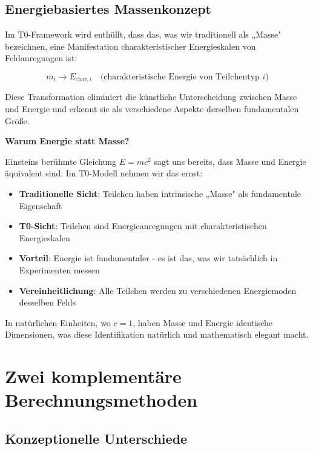 \documentclass[12pt,a4paper]{article}
\begin{document}
	\subsection{Energiebasiertes Massenkonzept}
	\label{subsec:energy_based_mass}
	
	Im T0-Framework wird enthüllt, dass das, was wir traditionell als „Masse" bezeichnen, eine Manifestation charakteristischer Energieskalen von Feldanregungen ist:
	
	\begin{equation}
		\boxed{m_i \rightarrow E_{\text{char},i} \quad \text{(charakteristische Energie von Teilchentyp } i\text{)}}
		\label{eq:mass_to_energy}
	\end{equation}
	
	Diese Transformation eliminiert die künstliche Unterscheidung zwischen Masse und Energie und erkennt sie als verschiedene Aspekte derselben fundamentalen Größe.
	
	\textbf{Warum Energie statt Masse?}
	
	Einsteins berühmte Gleichung $E = mc^2$ sagt uns bereits, dass Masse und Energie äquivalent sind. Im T0-Modell nehmen wir das ernst:
	
	\begin{itemize}
		\item \textbf{Traditionelle Sicht}: Teilchen haben intrinsische „Masse" als fundamentale Eigenschaft
		\item \textbf{T0-Sicht}: Teilchen sind Energieanregungen mit charakteristischen Energieskalen
		\item \textbf{Vorteil}: Energie ist fundamentaler - es ist das, was wir tatsächlich in Experimenten messen
		\item \textbf{Vereinheitlichung}: Alle Teilchen werden zu verschiedenen Energiemoden desselben Felds
	\end{itemize}
	
	In natürlichen Einheiten, wo $c = 1$, haben Masse und Energie identische Dimensionen, was diese Identifikation natürlich und mathematisch elegant macht.
	
	\section{Zwei komplementäre Berechnungsmethoden}
	\label{sec:two_calculation_methods}
	
	\subsection{Konzeptionelle Unterschiede}
	\label{subsec:conceptual_differences}
	
\end{document}
